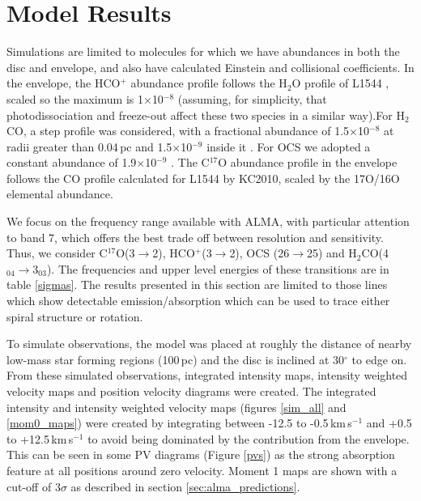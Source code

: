 \documentclass[useAMS,usenatbib]{mn2e}
\begin{document}
\section{Model Results} \label{sec:model_results}

Simulations are limited to molecules for which we have abundances in both the disc and envelope, and also have calculated Einstein and collisional coefficients. In the envelope, the HCO$^+$ abundance profile follows the H$_2$O profile of L1544 \citep{Caselli2012}, scaled so the maximum is 1$\times$10$^{-8}$ (assuming, for simplicity, that photodissociation and freeze-out affect these two species in a similar way).For H$_2$CO, a step profile was considered, with a fractional abundance of 1.5$\times$10$^{-8}$ at radii greater than 0.04$\,$pc and 1.5$\times$10$^{-9}$ inside it \citep{Young2004}. For OCS we adopted a constant abundance of 1.9$\times$10$^{-9}$ \citep{Ren2011}. The C$^{17}$O abundance profile in the envelope follows the CO profile calculated for L1544 by KC2010, scaled by the 17O/16O elemental abundance. \smallskip

We focus on the frequency range available with ALMA, with particular attention to band 7, which offers the best trade off between resolution and sensitivity. Thus, we consider C$^{17}$O(3$\rightarrow$2), HCO$^+$(3$\rightarrow$2), OCS (26$\rightarrow$25) and H$_2$CO(4$_{04}\rightarrow$3$_{03}$).  The frequencies and upper level energies of these transitions are in table \ref{sigmas}. The results presented in this section are limited to those lines which show detectable emission/absorption which can be used to trace either spiral structure or rotation.\smallskip


To simulate observations, the model was placed at roughly the distance of nearby low-mass star forming regions (100$\,$pc) and the disc is inclined at 30$^\circ$ to edge on. From these simulated observations, integrated intensity maps, intensity weighted velocity maps and position velocity diagrams were created. The integrated intensity and intensity weighted velocity maps (figures \ref{sim_all} and \ref{mom0_maps}) were created by integrating between -12.5 to -0.5$\,$km$\,$s$^{-1}$ and +0.5 to +12.5$\,$km$\,$s$^{-1}$ to avoid being dominated by the contribution from the envelope. This can be seen in some PV diagrams  (Figure \ref{pvs}) as the strong absorption feature at all positions around zero velocity. Moment 1 maps are shown with a cut-off of 3$\sigma$ as described in section \ref{sec:alma_predictions}.\smallskip
\end{document}
